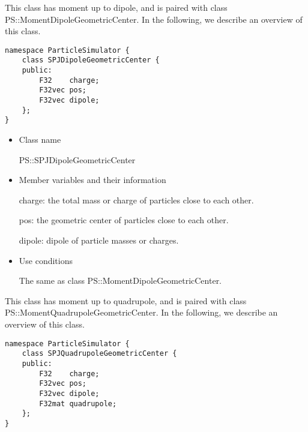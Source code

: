 
This class has moment up to dipole, and is paired with class
PS::MomentDipoleGeometricCenter. In the following, we describe an
overview of this class.
\begin{screen}
\begin{verbatim}
namespace ParticleSimulator {
    class SPJDipoleGeometricCenter {
    public:
        F32    charge;    
        F32vec pos;
        F32vec dipole;
    };
}
\end{verbatim}
\end{screen}

\begin{itemize}
\item Class name

  PS::SPJDipoleGeometricCenter

\item Member variables and their information

  charge: the total mass or charge of particles close to each other.

  pos: the geometric center of particles close to each other.

  dipole: dipole of particle masses or charges.

\item Use conditions

  The same as class PS::MomentDipoleGeometricCenter.

\end{itemize}


This class has moment up to quadrupole, and is paired with class \\
PS::MomentQuadrupoleGeometricCenter. In the following, we describe an
overview of this class.
\begin{screen}
\begin{verbatim}
namespace ParticleSimulator {
    class SPJQuadrupoleGeometricCenter {
    public:
        F32    charge;    
        F32vec pos;
        F32vec dipole;
        F32mat quadrupole;
    };
}
\end{verbatim}
\end{screen}

